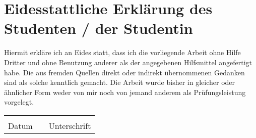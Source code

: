 \documentclass[12pt]{article}
\begin{document}
\pagestyle{fancy} %
\fancyhf{} %

\vspace*{1.5em}

\section*{Eidesstattliche Erklärung des Studenten / der Studentin}

Hiermit erkläre ich an Eides statt, dass ich die vorliegende Arbeit ohne Hilfe Dritter und ohne
Benutzung anderer als der angegebenen Hilfsmittel angefertigt habe. Die aus fremden
Quellen direkt oder indirekt übernommenen Gedanken sind als solche kenntlich gemacht.
Die Arbeit wurde bisher in gleicher oder ähnlicher Form weder von mir noch von jemand
anderem als Prüfungsleistung vorgelegt.

\vspace{3em}

\renewcommand{\arraystretch}{1.5} %

\begin{tabular}{%
        m{}
        m{}
        m{}
    }
          &  &              \\ \cline{1-1} \cline{3-3}
    Datum &  & Unterschrift \\
\end{tabular}
\end{document}
